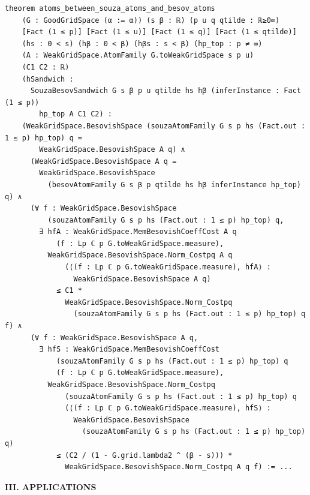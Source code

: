 \documentclass[11pt]{amsart}
\theoremstyle{definition}
\begin{document}
\begin{lstlisting}[style=lean,basicstyle=\ttfamily\scriptsize]
theorem atoms_between_souza_atoms_and_besov_atoms
    (G : GoodGridSpace (α := α)) (s β : ℝ) (p u q qtilde : ℝ≥0∞)
    [Fact (1 ≤ p)] [Fact (1 ≤ u)] [Fact (1 ≤ q)] [Fact (1 ≤ qtilde)]
    (hs : 0 < s) (hβ : 0 < β) (hβs : s < β) (hp_top : p ≠ ∞)
    (A : WeakGridSpace.AtomFamily G.toWeakGridSpace s p u)
    (C1 C2 : ℝ)
    (hSandwich :
      SouzaBesovSandwich G s β p u qtilde hs hβ (inferInstance : Fact (1 ≤ p))
        hp_top A C1 C2) :
    (WeakGridSpace.BesovishSpace (souzaAtomFamily G s p hs (Fact.out : 1 ≤ p) hp_top) q =
        WeakGridSpace.BesovishSpace A q) ∧
      (WeakGridSpace.BesovishSpace A q =
        WeakGridSpace.BesovishSpace
          (besovAtomFamily G s β p qtilde hs hβ inferInstance hp_top) q) ∧
      (∀ f : WeakGridSpace.BesovishSpace
          (souzaAtomFamily G s p hs (Fact.out : 1 ≤ p) hp_top) q,
        ∃ hfA : WeakGridSpace.MemBesovishCoeffCost A q
            (f : Lp ℂ p G.toWeakGridSpace.measure),
          WeakGridSpace.BesovishSpace.Norm_Costpq A q
              (⟨(f : Lp ℂ p G.toWeakGridSpace.measure), hfA⟩ :
                WeakGridSpace.BesovishSpace A q)
            ≤ C1 *
              WeakGridSpace.BesovishSpace.Norm_Costpq
                (souzaAtomFamily G s p hs (Fact.out : 1 ≤ p) hp_top) q f) ∧
      (∀ f : WeakGridSpace.BesovishSpace A q,
        ∃ hfS : WeakGridSpace.MemBesovishCoeffCost
            (souzaAtomFamily G s p hs (Fact.out : 1 ≤ p) hp_top) q
            (f : Lp ℂ p G.toWeakGridSpace.measure),
          WeakGridSpace.BesovishSpace.Norm_Costpq
              (souzaAtomFamily G s p hs (Fact.out : 1 ≤ p) hp_top) q
              (⟨(f : Lp ℂ p G.toWeakGridSpace.measure), hfS⟩ :
                WeakGridSpace.BesovishSpace
                  (souzaAtomFamily G s p hs (Fact.out : 1 ≤ p) hp_top) q)
            ≤ (C2 / (1 - G.grid.lambda2 ^ (β - s))) *
              WeakGridSpace.BesovishSpace.Norm_Costpq A q f) := ...
\end{lstlisting}

\vspace{8mm}
\centerline{\Large\bf III. APPLICATIONS}
\vspace{6mm}

\begin{center}
\fbox{\begin{minipage}{0.88\textwidth}
\centering
In Part III we suppose that $0<s<1/p$, \ $p\in [1,\infty)$ \ and \
$q\in [1,\infty]$.
\end{minipage}}
\end{center}
\vspace{4mm}
\end{document}
